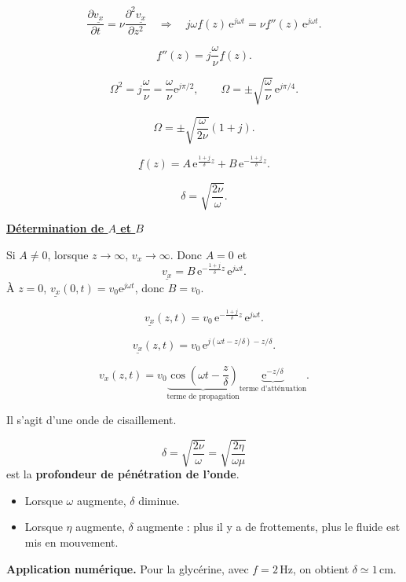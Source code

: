 \documentclass[11pt,a4paper]{article}
\newcommand{\pd}[2]{\frac{\partial #1}{\partial #2}}
\newcommand{\titr}[1]{\par\textbf{\underline{#1}}\par\nopagebreak[3]}
\newcommand{\cv}{\underline{v_x}}\newcommand{\cf}{\underline f}
\begin{document}
\[\pd{\cv}{t}=\nu\frac{\partial^2\cv}{\partial z^2}\quad\Longrightarrow\quad j\omega\cf(z)\,\mathrm e^{j\omega t}=\nu\cf''(z)\,\mathrm e^{j\omega t}.\]
\begin{cadre}\[\cf''(z)=j\frac\omega\nu\cf(z).\]\end{cadre}
\[\Omega^2=j\frac\omega\nu=\frac\omega\nu\mathrm e^{j\pi/2},\qquad\Omega=\pm\sqrt{\frac\omega\nu}\,\mathrm e^{j\pi/4}.\]
\begin{cadre}\[\Omega=\pm\sqrt{\frac\omega{2\nu}}(1+j).\]\end{cadre}
\[\cf(z)=A\,\mathrm e^{\frac{1+j}\delta z}+B\,\mathrm e^{-\frac{1+j}\delta z}.\]
\begin{cadre}\[\delta=\sqrt{\frac{2\nu}\omega}.\]\end{cadre}
\titr{Détermination de $A$ et $B$}
Si $A\ne0$, lorsque $z\to\infty$, $v_x\to\infty$. Donc $A=0$ et
\[\cv=B\,\mathrm e^{-\frac{1+j}\delta z}\,\mathrm e^{j\omega t}.\]
À $z=0$, $\cv(0,t)=v_0\mathrm e^{j\omega t}$, donc $B=v_0$.
\begin{cadre}\[\cv(z,t)=v_0\,\mathrm e^{-\frac{1+j}\delta z}\,\mathrm e^{j\omega t}.\]\end{cadre}
\[\cv(z,t)=v_0\,\mathrm e^{j(\omega t-z/\delta)-z/\delta}.\]
\begin{cadre}\[v_x(z,t)=v_0\underbrace{\cos\left(\omega t-\frac z\delta\right)}_{\text{terme de propagation}}\underbrace{\mathrm e^{-z/\delta}}_{\text{terme d'atténuation}}.\]\end{cadre}
Il s'agit d'une onde de cisaillement.
\begin{center}\end{center}
\[\delta=\sqrt{\frac{2\nu}\omega}=\sqrt{\frac{2\eta}{\omega\mu}}\]
est la \textbf{profondeur de pénétration de l'onde}.
\begin{itemize}
\item Lorsque $\omega$ augmente, $\delta$ diminue.
\item Lorsque $\eta$ augmente, $\delta$ augmente : plus il y a de frottements, plus le fluide est mis en mouvement.
\end{itemize}
\textbf{Application numérique.} Pour la glycérine, avec $f=2\,\mathrm{Hz}$, on obtient $\delta\simeq1\,\mathrm{cm}$.
\end{document}
